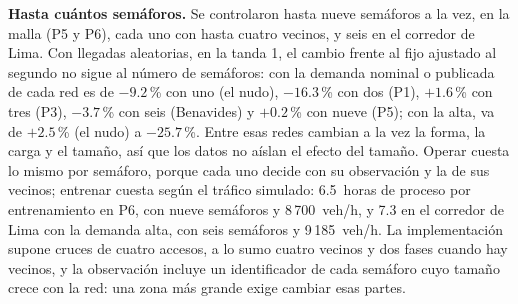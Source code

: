 \noindent\textbf{Hasta cuántos semáforos.} Se controlaron hasta nueve
semáforos a la vez, en la malla (P5 y P6), cada uno con hasta cuatro
vecinos, y seis en el corredor de Lima. Con llegadas aleatorias, en la
tanda 1, el cambio frente al fijo ajustado al segundo no sigue al número
de semáforos: con la demanda nominal o publicada de cada red es de
$-9.2$\,\% con uno (el nudo), $-16.3$\,\% con dos (P1), $+1.6$\,\% con
tres (P3), $-3.7$\,\% con seis (Benavides) y $+0.2$\,\% con nueve (P5);
con la alta, va de $+2.5$\,\% (el nudo) a $-25.7$\,\%. Entre esas redes
cambian a la vez la forma, la carga y el tamaño, así que los datos no
aíslan el efecto del tamaño. Operar cuesta lo mismo por semáforo,
porque cada uno decide con su observación y la de sus vecinos; entrenar
cuesta según el tráfico simulado: 6.5~horas de proceso por
entrenamiento en P6, con nueve semáforos y 8\,700~veh/h, y 7.3 en el
corredor de Lima con la demanda alta, con seis semáforos y
9\,185~veh/h. La implementación supone cruces de cuatro accesos, a lo
sumo cuatro vecinos y dos fases cuando hay vecinos, y la observación
incluye un identificador de cada semáforo cuyo tamaño crece con la red:
una zona más grande exige cambiar esas partes.

